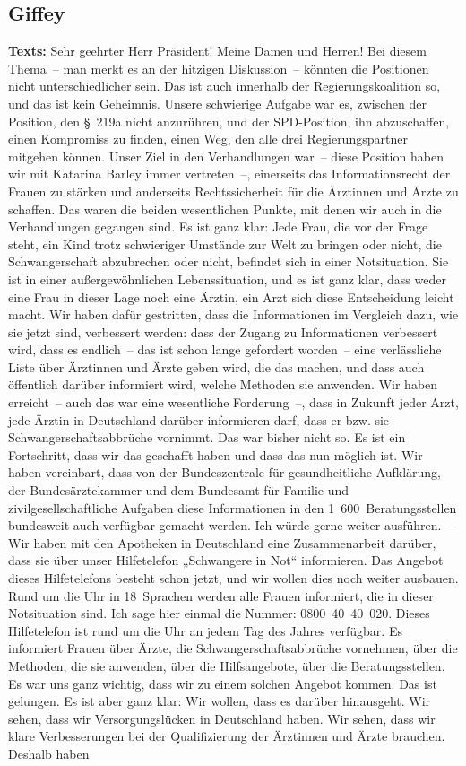 \documentclass{article}
\begin{document}
\subsection{Giffey}
\noindent\textbf{Texts:} Sehr geehrter Herr Präsident! Meine Damen und Herren! Bei diesem Thema – man merkt es an der hitzigen Diskussion – könnten die Positionen nicht unterschiedlicher sein. Das ist auch innerhalb der Regierungskoalition so, und das ist kein Geheimnis. Unsere schwierige Aufgabe war es, zwischen der Position, den § 219a nicht anzurühren, und der SPD-Position, ihn abzuschaffen, einen Kompromiss zu finden, einen Weg, den alle drei Regierungspartner mitgehen können. Unser Ziel in den Verhandlungen war – diese Position haben wir mit Katarina Barley immer vertreten –, einerseits das Informationsrecht der Frauen zu stärken und anderseits Rechtssicherheit für die Ärztinnen und Ärzte zu schaffen.  Das waren die beiden wesentlichen Punkte, mit denen wir auch in die Verhandlungen gegangen sind. Es ist ganz klar: Jede Frau, die vor der Frage steht, ein Kind trotz schwieriger Umstände zur Welt zu bringen oder nicht, die Schwangerschaft abzubrechen oder nicht, befindet sich in einer Notsituation. Sie ist in einer außergewöhnlichen Lebenssituation, und es ist ganz klar, dass weder eine Frau in dieser Lage noch eine Ärztin, ein Arzt sich diese Entscheidung leicht macht.  Wir haben dafür gestritten, dass die Informationen im Vergleich dazu, wie sie jetzt sind, verbessert werden: dass der Zugang zu Informationen verbessert wird, dass es endlich – das ist schon lange gefordert worden – eine verlässliche Liste über Ärztinnen und Ärzte geben wird, die das machen, und dass auch öffentlich darüber informiert wird, welche Methoden sie anwenden. Wir haben erreicht – auch das war eine wesentliche Forderung –, dass in Zukunft jeder Arzt, jede Ärztin in Deutschland darüber informieren darf, dass er bzw. sie Schwangerschaftsabbrüche vornimmt. Das war bisher nicht so.  Es ist ein Fortschritt, dass wir das geschafft haben und dass das nun möglich ist. Wir haben vereinbart, dass von der Bundeszentrale für gesundheitliche Aufklärung, der Bundesärztekammer und dem Bundesamt für Familie und zivilgesellschaftliche Aufgaben diese Informationen in den 1 600 Beratungsstellen bundesweit auch verfügbar gemacht werden. Ich würde gerne weiter ausführen. – Wir haben mit den Apotheken in Deutschland eine Zusammenarbeit darüber, dass sie über unser Hilfetelefon „Schwangere in Not“ informieren. Das Angebot dieses Hilfetelefons besteht schon jetzt, und wir wollen dies noch weiter ausbauen. Rund um die Uhr in 18 Sprachen werden alle Frauen informiert, die in dieser Notsituation sind. Ich sage hier einmal die Nummer: 0800 40 40 020. Dieses Hilfetelefon ist rund um die Uhr an jedem Tag des Jahres verfügbar. Es informiert Frauen über Ärzte, die Schwangerschaftsabbrüche vornehmen, über die Methoden, die sie anwenden, über die Hilfsangebote, über die Beratungsstellen. Es war uns ganz wichtig, dass wir zu einem solchen Angebot kommen. Das ist gelungen.  Es ist aber ganz klar: Wir wollen, dass es darüber hinausgeht. Wir sehen, dass wir Versorgungslücken in Deutschland haben. Wir sehen, dass wir klare Verbesserungen bei der Qualifizierung der Ärztinnen und Ärzte brauchen. Deshalb haben 
\end{document}
